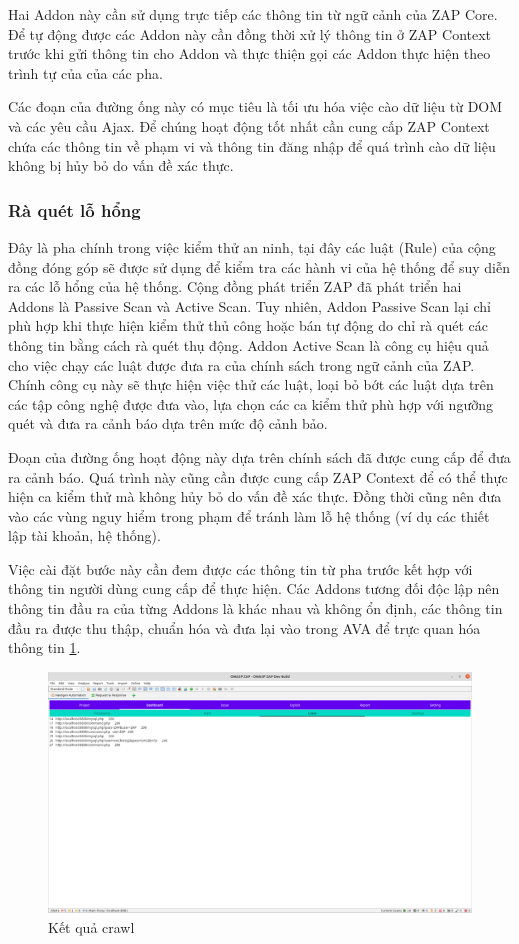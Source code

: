 \documentclass[./../main.tex]{subfiles}
\begin{document}
Hai Addon này cần sử dụng trực tiếp các thông tin từ ngữ cảnh của ZAP Core.
Để tự động được các Addon này cần đồng thời xử lý thông tin ở ZAP Context
trước khi gửi thông tin cho Addon và thực thiện gọi các Addon thực hiện
theo trình tự của của các pha.

Các đoạn của đường ống này có mục tiêu là tối ưu hóa việc cào dữ liệu từ
DOM và các yêu cầu Ajax. Để chúng hoạt động tốt nhất cần cung cấp
ZAP Context chứa các thông tin về phạm vi và thông tin đăng nhập để quá
trình cào dữ liệu không bị hủy bỏ do vấn đề xác thực.

\subsubsection{Rà quét lỗ hổng}

Đây là pha chính trong việc kiểm thử an ninh, tại đây các luật (Rule)
của cộng đồng đóng góp sẽ được sử dụng để kiểm tra các hành vi của hệ
thống để suy diễn ra các lỗ hổng của hệ thống. Cộng đồng phát triển ZAP
đã phát triển hai Addons là Passive Scan và Active Scan. Tuy nhiên,
Addon Passive Scan lại chỉ phù hợp khi thực hiện kiểm thử thủ công hoặc bán
tự động do chỉ rà quét các thông tin bằng cách rà quét thụ động. Addon Active Scan
là công cụ hiệu quả cho việc chạy các luật được đưa ra của chính sách trong
ngữ cảnh của ZAP. Chính công cụ này sẽ thực hiện việc thử các luật, loại bỏ
bớt các luật dựa trên các tập công nghệ được đưa vào, lựa chọn các ca kiểm
thử phù hợp với ngưỡng quét và đưa ra cảnh báo dựa trên mức độ cảnh bảo.

Đoạn của đường ống hoạt động này dựa trên chính sách đã được cung cấp để đưa ra
cảnh báo. Quá trình này cũng cần được cung cấp ZAP Context để có thể thực
hiện ca kiểm thử mà không hủy bỏ do vấn đề xác thực. Đồng thời cũng nên đưa
vào các vùng nguy hiểm trong phạm để tránh làm lỗ hệ thống (ví dụ các
thiết lập tài khoản, hệ thống).

Việc cài đặt bước này cần đem được các thông tin từ pha trước kết hợp
với thông tin người dùng cung cấp để thực hiện. Các Addons tương đối độc
lập nên thông tin đầu ra của từng Addons là khác nhau và không ổn định,
các thông tin đầu ra được thu thập, chuẩn hóa và đưa lại vào trong AVA
để trực quan hóa thông tin \ref{fig:scan_result}.

\begin{figure}[h!]
	\includegraphics[width=\linewidth]{./images/scan_result.png}
	\caption{Kết quả crawl}
	\label{fig:scan_result}
\end{figure}
\end{document}

